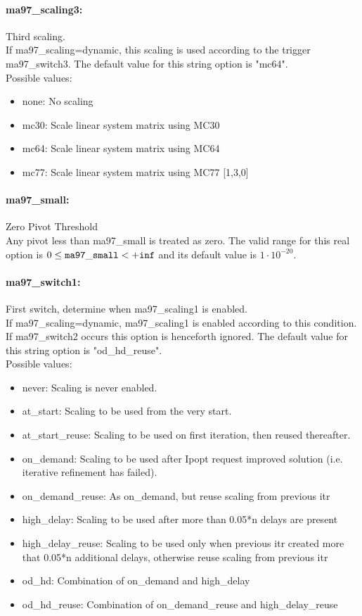 \paragraph{ma97\_scaling3:}\label{opt:ma97_scaling3} Third scaling. \\
 If ma97\_scaling=dynamic, this scaling is used according to the trigger ma97\_switch3. The default value for this string option is "mc64".
\\ 
Possible values:
\begin{itemize}
   \item none: No scaling
   \item mc30: Scale linear system matrix using MC30
   \item mc64: Scale linear system matrix using MC64
   \item mc77: Scale linear system matrix using MC77 [1,3,0]
\end{itemize}

\paragraph{ma97\_small:}\label{opt:ma97_small} Zero Pivot Threshold \\
 Any pivot less than ma97\_small is treated as zero. The valid range for this real option is 
$0 \le {\tt ma97\_small } <  {\tt +inf}$
and its default value is $1 \cdot 10^{-20}$.


\paragraph{ma97\_switch1:}\label{opt:ma97_switch1} First switch, determine when ma97\_scaling1 is enabled. \\
 If ma97\_scaling=dynamic, ma97\_scaling1 is enabled according to this condition. If ma97\_switch2 occurs this option is henceforth ignored. The default value for this string option is "od\_hd\_reuse".
\\ 
Possible values:
\begin{itemize}
   \item never: Scaling is never enabled.
   \item at\_start: Scaling to be used from the very start.
   \item at\_start\_reuse: Scaling to be used on first iteration, then reused thereafter.
   \item on\_demand: Scaling to be used after Ipopt request improved solution (i.e. iterative refinement has failed).
   \item on\_demand\_reuse: As on\_demand, but reuse scaling from previous itr
   \item high\_delay: Scaling to be used after more than 0.05*n delays are present
   \item high\_delay\_reuse: Scaling to be used only when previous itr created more that 0.05*n additional delays, otherwise reuse scaling from previous itr
   \item od\_hd: Combination of on\_demand and high\_delay
   \item od\_hd\_reuse: Combination of on\_demand\_reuse and high\_delay\_reuse
\end{itemize}

